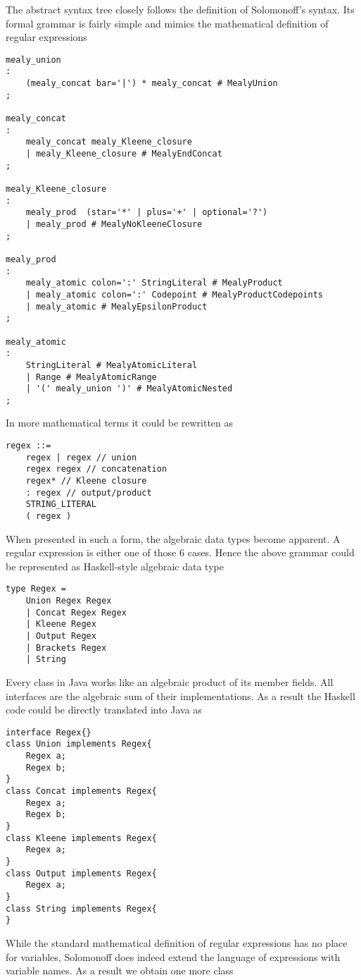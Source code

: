 The abstract syntax tree closely follows the definition of Solomonoff's syntax. Its formal grammar is fairly simple and mimics the mathematical definition of regular expressions
\begin{lstlisting}
mealy_union
:
    (mealy_concat bar='|') * mealy_concat # MealyUnion
;

mealy_concat
:
    mealy_concat mealy_Kleene_closure
    | mealy_Kleene_closure # MealyEndConcat
;

mealy_Kleene_closure
:
    mealy_prod  (star='*' | plus='+' | optional='?') 
    | mealy_prod # MealyNoKleeneClosure
;

mealy_prod
:
    mealy_atomic colon=':' StringLiteral # MealyProduct
    | mealy_atomic colon=':' Codepoint # MealyProductCodepoints
    | mealy_atomic # MealyEpsilonProduct
;

mealy_atomic
:
    StringLiteral # MealyAtomicLiteral
    | Range # MealyAtomicRange
    | '(' mealy_union ')' # MealyAtomicNested
;
\end{lstlisting}
In more mathematical terms it could be rewritten as
\begin{lstlisting}
regex ::= 
    regex | regex // union
    regex regex // concatenation
    regex* // Kleene closure
    : regex // output/product
    STRING_LITERAL 
    ( regex ) 
\end{lstlisting}
When presented in such a form, the algebraic data types become apparent.
A regular expression is either one of those 6 cases. Hence the above grammar could be represented as Haskell-style algebraic data type
\begin{lstlisting}
type Regex = 
    Union Regex Regex 
    | Concat Regex Regex
    | Kleene Regex
    | Output Regex
    | Brackets Regex
    | String
\end{lstlisting}
Every class in Java works like an algebraic product of its member fields. All interfaces are the algebraic sum of their implementations. As a result the Haskell code could be directly translated into Java as
\begin{lstlisting}
interface Regex{}
class Union implements Regex{
    Regex a; 
    Regex b;
}
class Concat implements Regex{
    Regex a;
    Regex b;
}
class Kleene implements Regex{
    Regex a;
}
class Output implements Regex{
    Regex a;
}
class String implements Regex{
}
\end{lstlisting}
While the standard mathematical definition of regular expressions has no place
for variables, Solomonoff does indeed extend the language of expressions with variable names. As a result we obtain one more class
